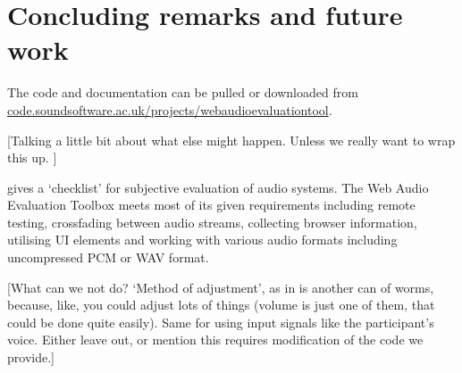 \documentclass{sig-alternate}
\begin{document}
\section{Concluding remarks and future work}
\label{sec:conclusion}
	
	The code and documentation can be pulled or downloaded from \url{code.soundsoftware.ac.uk/projects/webaudioevaluationtool}. 
	
	[Talking a little bit about what else might happen. Unless we really want to wrap this up. ]
	
	\cite{schoeffler2015mushra} gives a `checklist' for subjective evaluation of audio systems. The Web Audio Evaluation Toolbox meets most of its given requirements including remote testing, crossfading between audio streams, collecting browser information, utilising UI elements and working with various audio formats including uncompressed PCM or WAV format.

	[What can we not do? `Method of adjustment', as in \cite{schoeffler2015mushra} is another can of worms, because, like, you could adjust lots of things (volume is just one of them, that could be done quite easily). Same for using input signals like the participant's voice. Either leave out, or mention this requires modification of the code we provide.]

%

%
%
\end{document}
